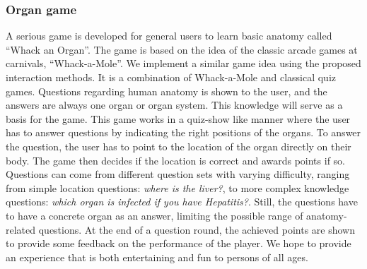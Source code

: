 
\subsubsection{Organ game}
A serious game is developed for general users to learn basic anatomy called ``Whack an Organ''. The game is based on the idea of the classic arcade games at carnivals, ``Whack-a-Mole''. We implement a similar game idea using the proposed interaction methods. It is a combination of Whack-a-Mole and classical quiz games. Questions regarding human anatomy is shown to the user, and the answers are always one organ or organ system. 
This knowledge will serve as a basis for the game. This game works in a quiz-show like manner where the user has to answer questions by indicating the right positions of the organs.
To answer the question, the user has to point to the location of the organ directly on their body. 
The game then decides if the location is correct and awards points if so. Questions can come from different question sets with varying difficulty, ranging from simple location questions: \textit{where is the liver?}, to more complex knowledge questions: \textit{which organ is infected if you have Hepatitis?}.
Still, the questions have to have a concrete organ as an answer, limiting the possible range of anatomy-related questions. At the end of a question round, the achieved points are shown to provide some feedback on the performance of the player.
We hope to provide an experience that is both entertaining and fun to persons of all ages.

